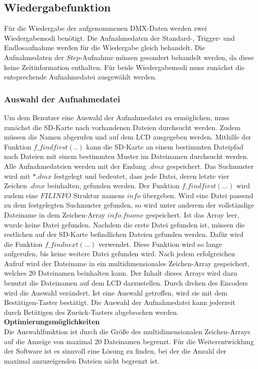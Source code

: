 
\subsection{Wiedergabefunktion}
Für die Wiedergabe der aufgenommenen DMX-Daten werden zwei Wiedergabemodi benötigt. Die Aufnahmedaten der Standard-, Trigger- und Endlosaufnahme werden für die Wiedergabe gleich behandelt. Die Aufnahmedaten der $Step$-Aufnahme müssen gesondert behandelt werden, da diese keine Zeitinformation enthalten. Für beide Wiedergabemodi muss zunächst die entsprechende Aufnahmedatei ausgewählt werden.

\subsubsection{Auswahl der Aufnahmedatei}
\label{sec:selectfile}
Um dem Benutzer eine Auswahl der Aufnahmedatei zu ermöglichen, muss zunächst die SD-Karte nach vorhandenen Dateien durchsucht werden. Zudem müssen die Namen abgerufen und auf dem LCD ausgegeben werden. Mithilfe der Funktion $f\_findfirst(..)$ kann die SD-Karte an einem bestimmten Dateipfad nach Dateien mit einem bestimmten Muster im Dateinamen durchsucht werden. Alle Aufnahmedateien werden mit der Endung $.dmx$ gespeichert. Das Suchmuster wird mit $*.dmx$ festgelegt und bedeutet, dass jede Datei, deren letzte vier Zeichen $.dmx$ beinhalten, gefunden werden. Der Funktion $f\_findfirst(...)$ wird zudem eine $FILINFO$ Struktur namens $info$ übergeben. Wird eine Datei passend zu dem festgelegten Suchmuster gefunden, so wird unter anderem der vollständige Dateiname in dem Zeichen-Array $info.fname$ gespeichert. Ist das Array leer, wurde keine Datei gefunden. Nachdem die erste Datei gefunden ist, müssen die restlichen auf der SD-Karte befindlichen Dateien gefunden werden. Dafür wird die Funktion $f\_findnext(...)$ verwendet. Diese Funktion wird so lange aufgerufen, bis keine weitere Datei gefunden wird. Nach jedem erfolgreichen Aufruf wird der Dateiname in ein multidimensionales Zeichen-Array gespeichert, welches 20 Dateinamen beinhalten kann. Der Inhalt dieses Arrays wird dazu benutzt die Dateinamen auf dem LCD darzustellen. Durch drehen des Encoders wird die Auswahl verändert. Ist eine Auswahl getroffen, wird sie mit dem Bestätigen-Taster bestätigt. Die Auswahl der Aufnahmedatei kann jederzeit durch Betätigen des Zurück-Tasters abgebrochen werden.\\
\newline
\textbf{Optimierungsmöglichkeiten}\\
Die Auswahlfunktion ist durch die Größe des multidimensionalen Zeichen-Arrays auf die Anzeige von maximal 20 Dateinamen begrenzt. Für die Weiterentwicklung der Software ist es sinnvoll eine Lösung zu finden, bei der die Anzahl der maximal anzuzeigenden Dateien nicht begrenzt ist.

